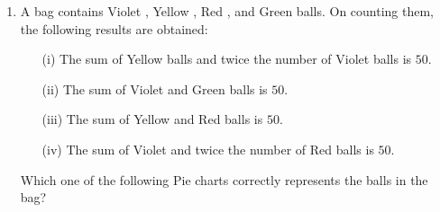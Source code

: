 \documentclass[journal,12pt,onecolumn]{article}
\theoremstyle{remark}
\begin{document}
\begin{enumerate}
    \item A bag contains Violet , Yellow , Red , and Green  balls. On counting them, the following results are obtained:
    \begin{enumerate}
        \item[(i)] The sum of Yellow balls and twice the number of Violet balls is $50$.
        \item[(ii)] The sum of Violet and Green balls is $50$.
        \item[(iii)] The sum of Yellow and Red balls is $50$.
        \item[(iv)] The sum of Violet and twice the number of Red balls is $50$.
    \end{enumerate}
    Which one of the following Pie charts correctly represents the balls in the bag?


\end{enumerate}
\end{document}
